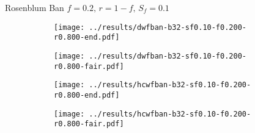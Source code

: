 \documentclass[10pt,a4paper]{beamer}
\begin{document}
	
	
	
	\begin{frame}{Rosenblum Ban $f=0.2,\, r=1-f,\,S_f=0.1$}
		\begin{figure}
			\begin{subfigure}{.48\textwidth}
				\centering
				\texttt{[image: ../results/dwfban-b32-sf0.10-f0.200-r0.800-end.pdf]}
			\end{subfigure}
			\begin{subfigure}{.48\textwidth}
				\centering
				\texttt{[image: ../results/dwfban-b32-sf0.10-f0.200-r0.800-fair.pdf]}
			\end{subfigure}
		\end{figure}
		
		\begin{figure}
			\begin{subfigure}{.48\textwidth}
				\centering
				\texttt{[image: ../results/hcwfban-b32-sf0.10-f0.200-r0.800-end.pdf]}
			\end{subfigure}
			\begin{subfigure}{.48\textwidth}
				\centering
				\texttt{[image: ../results/hcwfban-b32-sf0.10-f0.200-r0.800-fair.pdf]}
			\end{subfigure}
		\end{figure}
	\end{frame}
	
%		
	
\end{document}
